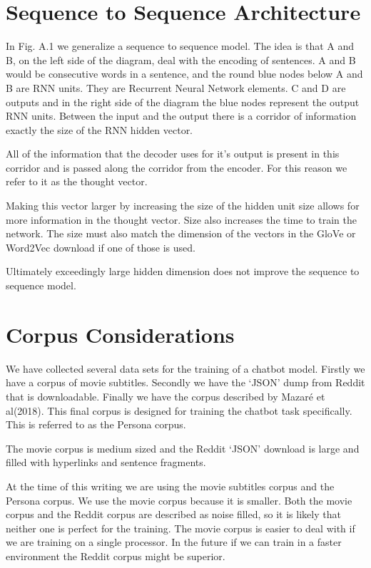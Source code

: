 \section{Sequence to Sequence Architecture}

In Fig. A.1 we generalize a sequence to sequence model. The idea is
that A and B, on the left side of the diagram, deal with the encoding
of sentences. A and B would be consecutive words in a sentence, and
the round blue nodes below A and B are RNN units. They are Recurrent
Neural Network elements. C and D are outputs and in the right side
of the diagram the blue nodes represent the output RNN units. Between
the input and the output there is a corridor of information exactly
the size of the RNN hidden vector. 

All of the information that the decoder uses for it\textquoteright s
output is present in this corridor and is passed along the corridor
from the encoder. For this reason we refer to it as the thought vector.

Making this vector larger by increasing the size of the hidden unit
size allows for more information in the thought vector. Size also
increases the time to train the network. The size must also match
the dimension of the vectors in the GloVe or Word2Vec download if
one of those is used. 

Ultimately exceedingly large hidden dimension does not improve the
sequence to sequence model. 



\section{Corpus Considerations}
We have collected several data sets for the training of a chatbot model. Firstly we have a corpus of movie subtitles. Secondly we have the `JSON' dump from Reddit that is downloadable. Finally we have the corpus described by Mazar{\'{e}} et al(2018)\cite{DBLP:journals/corr/abs-1809-01984}. This final corpus is designed for training the chatbot task specifically. This is referred to as the Persona corpus.

The movie corpus is medium sized and the Reddit `JSON' download is large
and filled with hyperlinks and sentence fragments. 

At the time of
this writing we are using the movie subtitles corpus and the Persona corpus. We use the movie
corpus because it is smaller. Both the movie corpus and the Reddit
corpus are described as noise filled, so it is likely that neither
one is perfect for the training. The movie corpus is easier to deal
with if we are training on a single processor. In the future if we
can train in a faster environment the Reddit corpus might be superior.


